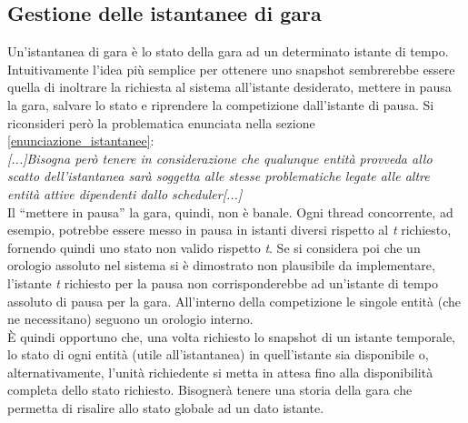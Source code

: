 \subsection{Gestione delle istantanee di gara}
\label{analisi_istantanee}
Un'istantanea di gara è lo stato della gara ad un determinato istante di tempo.
Intuitivamente l'idea più semplice per ottenere
uno snapshot sembrerebbe essere quella di inoltrare la richiesta al sistema
all'istante desiderato, mettere in pausa la gara, 
salvare lo stato e riprendere la competizione dall'istante di pausa. Si
riconsideri però la problematica enunciata nella
sezione \ref{enunciazione_istantanee}:\\
\emph{[...]Bisogna però tenere in considerazione che qualunque entità provveda
allo scatto
dell'istantanea sarà soggetta alle stesse problematiche legate alle altre entità
attive dipendenti dallo scheduler[...]}\\
Il ``mettere in pausa'' la gara, quindi, non è banale. Ogni thread concorrente,
ad esempio, potrebbe essere messo in pausa
in istanti diversi rispetto al \emph{t} richiesto, fornendo quindi uno stato non
valido rispetto \emph{t}. 
Se si considera poi che un orologio assoluto nel sistema si è dimostrato non
plausibile da implementare, l'istante \emph{t} richiesto 
per la pausa non corrisponderebbe ad un'istante
di tempo assoluto di pausa per la gara. All'interno della competizione le
singole entità (che ne necessitano) seguono un orologio interno.\\
\`{E} quindi opportuno che, una volta richiesto lo snapshot di un istante
temporale, lo stato di ogni entità (utile all'istantanea) in 
quell'istante sia disponibile o, alternativamente, l'unità richiedente si metta
in attesa fino alla disponibilità completa dello stato richiesto. 
Bisognerà tenere una storia della gara che permetta di risalire
allo stato globale ad un dato istante.
